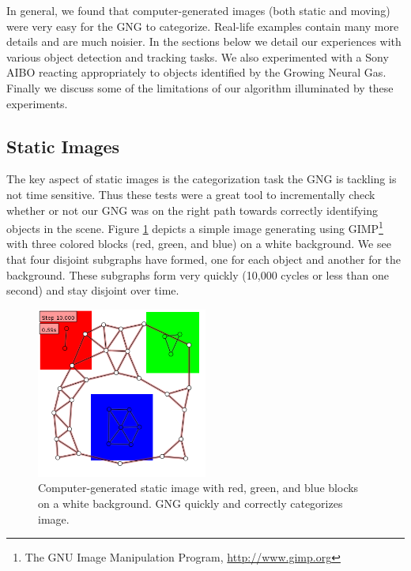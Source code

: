 \documentclass{article}
\renewcommand{\|}{\origbar} %
\begin{document}
In general, we found that computer-generated images (both static and moving) were very easy for the GNG to categorize. Real-life examples contain many more details and are much noisier. In the sections below we detail our experiences with various object detection and tracking tasks. We also experimented with a Sony AIBO reacting appropriately to objects identified by the Growing Neural Gas. Finally we discuss some of the limitations of our algorithm illuminated by these experiments.

\subsection{Static Images}

The key aspect of static images is the categorization task the GNG is tackling is not time sensitive. Thus these tests were a great tool to incrementally check whether or not our GNG was on the right path towards correctly identifying objects in the scene. Figure \ref{fig:rgbStatic} depicts a simple image generating using GIMP\footnote{The GNU Image Manipulation Program, \url{http://www.gimp.org}} with three colored blocks (red, green, and blue) on a white background. We see that four disjoint subgraphs have formed, one for each object and another for the background. These subgraphs form very quickly (10,000 cycles or less than one second) and stay disjoint over time. 

\begin{figure}[h!]
  \begin{center}
    \includegraphics[width=0.5\textwidth]{rgb_static.png}
  \end{center}
  \caption{Computer-generated static image with red, green, and blue blocks on a white background. GNG quickly and correctly categorizes image.}
  \label{fig:rgbStatic}
\end{figure}
\end{document}
